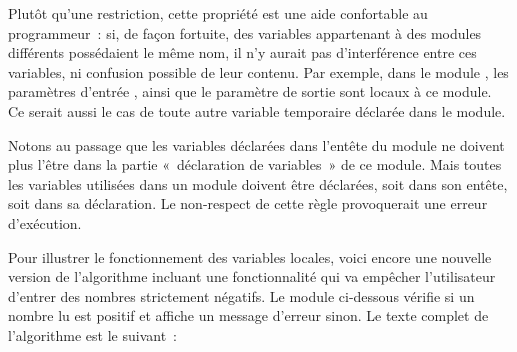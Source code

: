 	Plutôt qu’une restriction, cette propriété est
	une aide confortable au programmeur~: si, de
	façon fortuite, des variables appartenant à des modules différents
	possédaient le même nom, il n’y aurait pas d’interférence entre ces
	variables, ni confusion possible de leur
	contenu. Par exemple, dans le module
	, les paramètres d’entrée 
	, 
	ainsi que le paramètre de sortie 
	sont locaux à ce module. 
	Ce serait aussi le cas de toute autre variable temporaire 
	déclarée dans le module.

	Notons au passage que les variables déclarées dans l’entête du module ne
	doivent plus l’être dans la partie «~déclaration de variables~» de ce
	module. Mais toutes les variables utilisées dans un module doivent être
	déclarées, soit dans son entête, soit dans sa déclaration. Le
	non-respect de cette règle provoquerait une erreur d’exécution.

	Pour illustrer le fonctionnement des variables
	locales, voici encore une nouvelle version de l’algorithme incluant une
	fonctionnalité qui va empêcher l’utilisateur d’entrer des nombres
	strictement négatifs. Le module
	 ci-dessous
	vérifie si un nombre lu est positif et affiche un message
	d'erreur sinon. Le texte complet de l’algorithme est
	le suivant~:




